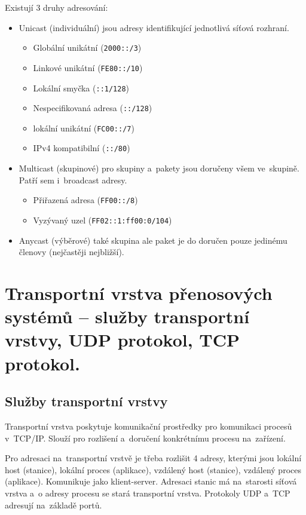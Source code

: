 Existují 3 druhy adresování:
\begin{itemize}[noitemsep]
    \item Unicast (individuální) jsou adresy identifikující jednotlivá síťová rozhraní.
    \begin{itemize}[noitemsep]
        \item Globální unikátní (\texttt{2000::/3})
        \item Linkové unikátní (\texttt{FE80::/10})
        \item Lokální smyčka (\texttt{::1/128})
        \item Nespecifikovaná adresa (\texttt{::/128})
        \item lokální unikátní (\texttt{FC00::/7})
        \item IPv4 kompatibilní (\texttt{::/80})
    \end{itemize}
    \item Multicast (skupinové) pro skupiny a~pakety jsou doručeny všem ve~skupině. Patří sem i~broadcast adresy.
    \begin{itemize}[noitemsep]
        \item Přiřazená adresa (\texttt{FF00::/8})
        \item Vyzývaný uzel (\texttt{FF02::1:ff00:0/104})
    \end{itemize}
    \item Anycast (výběrové) také skupina ale paket je do doručen pouze jedinému členovy (nejčastěji nejbližší).
\end{itemize}

\clearpage
\section{Transportní vrstva přenosových systémů -- služby transportní vrstvy, UDP protokol, TCP protokol.}

\subsection{Služby transportní vrstvy}

Transportní vrstva poskytuje komunikační prostředky pro komunikaci procesů v~TCP/IP. Slouží pro rozlišení a~doručení konkrétnímu procesu na~zařízení.

Pro adresaci na~transportní vrstvě je třeba rozlišit 4 adresy, kterými jsou lokální host (stanice), lokální proces (aplikace), vzdálený host (stanice), vzdálený proces (aplikace). Komunikuje jako klient-server. Adresaci stanic má na~starosti síťová vrstva a~o adresy procesu se stará transportní vrstva. Protokoly UDP a~TCP adresují na~základě portů.


